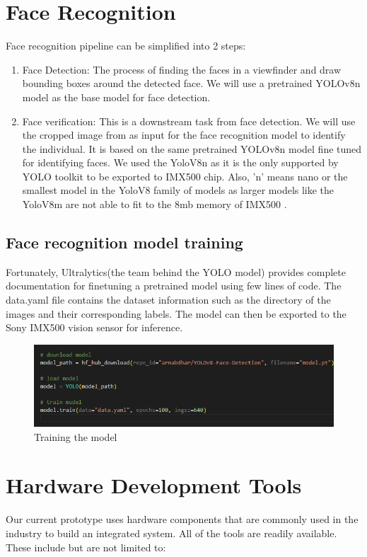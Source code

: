 \section{Face Recognition}
Face recognition pipeline can be simplified into 2 steps:
\begin{enumerate}
	\item Face Detection: The process of finding the faces in a viewfinder and draw bounding boxes around the detected face. We will use a pretrained YOLOv8n model
	as the base model for face detection.
	
	\item Face verification: This is a downstream task from face detection. We will use the cropped image from as input for the face recognition model to identify the individual. It is based on the same pretrained YOLOv8n model fine tuned for identifying faces. We used the YoloV8n as it is the only supported by YOLO toolkit to be exported to IMX500 chip. Also, 'n' means nano or the smallest model in the YoloV8 family of models as larger models like the YoloV8m are not able to fit to the 8mb memory of IMX500 \cite{sony_imx500}.
\end{enumerate}
\subsection{Face recognition model training} 
Fortunately, Ultralytics(the team behind the YOLO model) provides complete documentation for finetuning a pretrained model using few lines of code. The data.yaml file contains the dataset information such as the directory of the images and their corresponding labels. The model can then be exported to the Sony IMX500 vision sensor for inference\cite{ultralytics_yolo_docs_2024}. 
\begin{figure}[h] %
	\centering
	\includegraphics[width=1\textwidth]{figures/chapter3/train.png} %
	\caption{Training the model}
	\label{fig:api}
\end{figure} 


\section{Hardware Development Tools}
Our current prototype uses hardware components that are commonly used in the industry to build an integrated system. All of the tools are readily available. These include but are not limited to:


